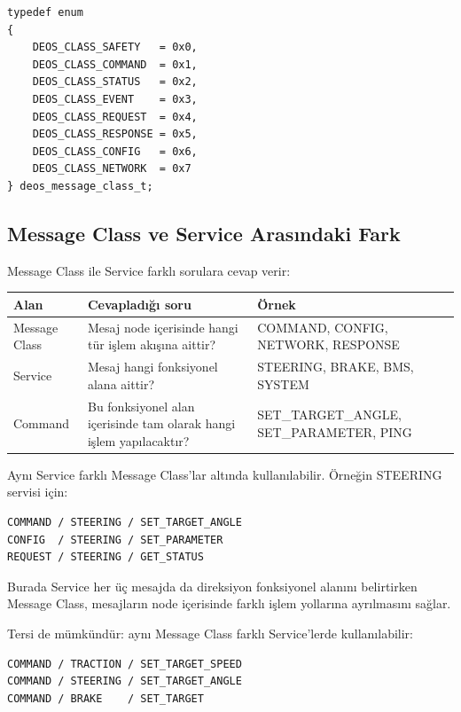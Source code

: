 \documentclass[a4paper,10pt]{article}
\begin{document}
\begin{lstlisting}[style=cstyle]
typedef enum
{
    DEOS_CLASS_SAFETY   = 0x0,
    DEOS_CLASS_COMMAND  = 0x1,
    DEOS_CLASS_STATUS   = 0x2,
    DEOS_CLASS_EVENT    = 0x3,
    DEOS_CLASS_REQUEST  = 0x4,
    DEOS_CLASS_RESPONSE = 0x5,
    DEOS_CLASS_CONFIG   = 0x6,
    DEOS_CLASS_NETWORK  = 0x7
} deos_message_class_t;
\end{lstlisting}

\subsection{Message Class ve Service Arasındaki Fark}

Message Class ile Service farklı sorulara cevap verir:

\begin{center}
\begin{tabularx}{\textwidth}{l X X}
\toprule
Alan & Cevapladığı soru & Örnek \\
\midrule
Message Class & Mesaj node içerisinde hangi tür işlem akışına aittir? & COMMAND, CONFIG, NETWORK, RESPONSE \\
Service & Mesaj hangi fonksiyonel alana aittir? & STEERING, BRAKE, BMS, SYSTEM \\
Command & Bu fonksiyonel alan içerisinde tam olarak hangi işlem yapılacaktır? & SET\_TARGET\_ANGLE, SET\_PARAMETER, PING \\
\bottomrule
\end{tabularx}
\end{center}

Aynı Service farklı Message Class'lar altında kullanılabilir. Örneğin STEERING servisi için:

\begin{verbatim}
COMMAND / STEERING / SET_TARGET_ANGLE
CONFIG  / STEERING / SET_PARAMETER
REQUEST / STEERING / GET_STATUS
\end{verbatim}

Burada Service her üç mesajda da direksiyon fonksiyonel alanını belirtirken Message Class,
mesajların node içerisinde farklı işlem yollarına ayrılmasını sağlar.

Tersi de mümkündür: aynı Message Class farklı Service'lerde kullanılabilir:

\begin{verbatim}
COMMAND / TRACTION / SET_TARGET_SPEED
COMMAND / STEERING / SET_TARGET_ANGLE
COMMAND / BRAKE    / SET_TARGET
\end{verbatim}
\end{document}
